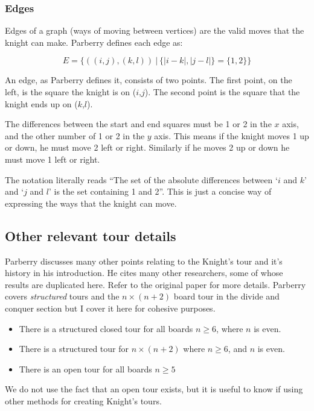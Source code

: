 \documentclass[11pt, a4paper]{article}
\begin{document}
\subsubsection{Edges}

Edges of a graph (ways of moving between vertices) are the valid moves that the knight can make. Parberry defines each edge as:

$$E = \{((i,j),(k,l))\ |\ \{|i-k|,|j-l|\} = \{1,2\}\}$$

An edge, as Parberry defines it, consists of two points. The first point, on the left, is the square the knight is on ($i$,$j$). The second point is the square that the knight ends up on ($k$,$l$).

The differences between the start and end squares must be 1 or 2 in the $x$ axis, and the other number of 1 or 2 in the $y$ axis. This means if the knight moves 1 up or down, he must move 2 left or right. Similarly if he moves 2 up or down he must move 1 left or right.

The notation literally reads ``The set of the absolute differences between `$i$ and $k$' and `$j$ and $l$' is the set containing 1 and 2''. This is just a concise way of expressing the ways that the knight can move.

\subsection{Other relevant tour details}

Parberry discusses many other points relating to the Knight's tour and it's history in his introduction. He cites many other researchers, some of whose results are duplicated here. Refer to the original paper for more details. Parberry covers \emph{structured} tours and the $n \times (n + 2)$ board tour in the divide and conquer section but I cover it here for cohesive purposes.

\begin{itemize}
\item There is a structured closed tour for all boards $n \ge 6$, where $n$ is even.
\item There is a structured tour for $n \times (n + 2)$ where $n \ge 6$, and $n$ is even.
\item There is an open tour for all boards $n \ge 5$
\end{itemize}

We do not use the fact that an open tour exists, but it is useful to know if using other methods for creating Knight's tours.
\end{document}

